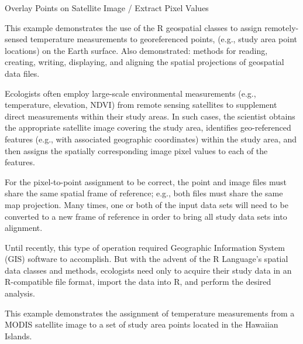 \documentclass{beamer}
\begin{document}
\begin{frame}[fragile]
\huge
Overlay Points on Satellite Image / Extract Pixel Values

\end{frame}
\begin{frame}

This example demonstrates the use of the R geospatial classes to assign remotely-sensed temperature measurements to georeferenced points, (e.g., study area point locations) on the Earth surface. Also demonstrated: methods for reading, creating, writing, displaying, and aligning the spatial projections of geospatial data files.
\end{frame}

\begin{frame}
Ecologists often employ large-scale environmental measurements (e.g., temperature, elevation, NDVI) from remote sensing satellites to supplement direct measurements within their study areas. In such cases, the scientist obtains the appropriate satellite image covering the study area, identifies geo-referenced features (e.g., with associated geographic coordinates) within the study area, and then assigns the spatially corresponding image pixel values to each of the features.

For the pixel-to-point assignment to be correct, the point and image files must share the same spatial frame of reference; e.g., both files must share the same map projection. Many times, one or both of the input data sets will need to be converted to a new frame of reference in order to bring all study data sets into alignment.
\end{frame}
\begin{frame}[fragile]

Until recently, this type of operation required Geographic Information System (GIS) software to accomplish. But with the advent of the R Language's spatial data classes and methods, ecologists need only to acquire their study data in an R-compatible file format, import the data into R, and perform the desired analysis.

This example demonstrates the assignment of temperature measurements from a MODIS satellite image to a set of study area points located in the Hawaiian Islands.
\end{frame}
\end{document}
